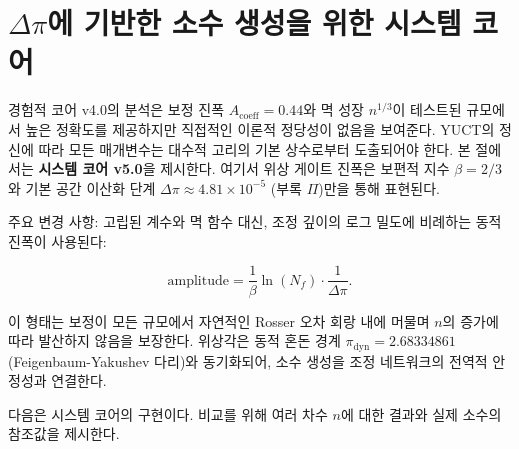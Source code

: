 \documentclass[11pt,a4paper]{article}
\begin{document}
	\small
	\section{\(\Delta\pi\)에 기반한 소수 생성을 위한 시스템 코어}
	\label{sec:systemic-prime}
	
	경험적 코어 v4.0의 분석은 보정 진폭 \(A_{\text{coeff}} = 0.44\)와 멱 성장 \(n^{1/3}\)이 테스트된 규모에서 높은 정확도를 제공하지만 직접적인 이론적 정당성이 없음을 보여준다. YUCT의 정신에 따라 모든 매개변수는 대수적 고리의 기본 상수로부터 도출되어야 한다. 본 절에서는 \textbf{시스템 코어 v5.0}을 제시한다. 여기서 위상 게이트 진폭은 보편적 지수 \(\beta = 2/3\)와 기본 공간 이산화 단계 \(\Delta\pi \approx 4.81 \times 10^{-5}\) (부록 \(\Pi\))만을 통해 표현된다.
	
	주요 변경 사항: 고립된 계수와 멱 함수 대신, 조정 깊이의 로그 밀도에 비례하는 동적 진폭이 사용된다:
	
	\[
	\text{amplitude} = \frac{1}{\beta} \ln(N_f) \cdot \frac{1}{\Delta\pi}.
	\]
	
	이 형태는 보정이 모든 규모에서 자연적인 Rosser 오차 회랑 내에 머물며 \(n\)의 증가에 따라 발산하지 않음을 보장한다. 위상각은 동적 혼돈 경계 \(\pi_{\text{dyn}} = 2.68334861\) (Feigenbaum-Yakushev 다리)와 동기화되어, 소수 생성을 조정 네트워크의 전역적 안정성과 연결한다.
	
	다음은 시스템 코어의 구현이다. 비교를 위해 여러 차수 \(n\)에 대한 결과와 실제 소수의 참조값을 제시한다.
	
\end{document}
